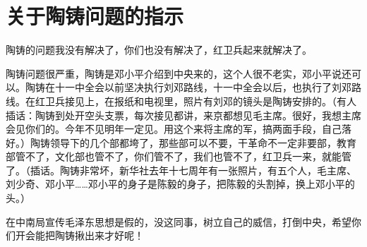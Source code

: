 \section[关于陶铸问题的指示（一九六七年一月八日）]{关于陶铸问题的指示}

陶铸的问题我没有解决了，你们也没有解决了，红卫兵起来就解决了。

陶铸问题很严重，陶铸是邓小平介绍到中央来的，这个人很不老实，邓小平说还可以。陶铸在十一中全会以前坚决执行刘邓路线，十一中全会以后，也执行了刘邓路线。在红卫兵接见上，在报纸和电视里，照片有刘邓的镜头是陶铸安排的。（有人插话：陶铸到处开空头支票，每次接见都讲，来京都想见毛主席。很好，我想主席会见你们的。今年不见明年一定见。用这个来将主席的军，搞两面手段，自己落好。）陶铸领导下的几个部都垮了，那些部可以不要，干革命不一定非要部，教育部管不了，文化部也管不了，你们管不了，我们也管不了，红卫兵一来，就能管了。（插话。陶铸非常坏，新华社去年十七周年有一张照片，有五个人，毛主席、刘少奇、邓小平……邓小平的身子是陈毅的身子，把陈毅的头割掉，换上邓小平的头。）

在中南局宣传毛泽东思想是假的，没这同事，树立自己的威信，打倒中央，希望你们开会能把陶铸揪出来才好呢！

